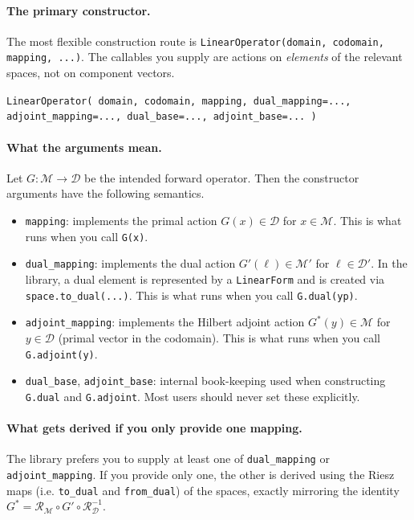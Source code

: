 \documentclass[11pt,twoside,openright]{book}
\theoremstyle{plain}
\theoremstyle{definition}
\theoremstyle{remark}
\newcommand{\modelspace}{\mathcal{M}}
\newcommand{\dataspace}{\mathcal{D}}
\newcommand{\Riesz}{\mathcal{R}}
\begin{document}
\paragraph{The primary constructor.}
The most flexible construction route is
\texttt{LinearOperator(domain, codomain, mapping, ...)}.
The callables you supply are actions on \emph{elements} of the relevant spaces,
not on component vectors.

\begin{codebox}
\texttt{LinearOperator(\
  domain, codomain, mapping,\
  dual\_mapping=..., adjoint\_mapping=...,\
  dual\_base=..., adjoint\_base=...\
)}
\end{codebox}

\paragraph{What the arguments mean.}
Let $G: \modelspace \to \dataspace$ be the intended forward operator.
Then the constructor arguments have the following semantics.
\begin{itemize}
  \item \texttt{mapping}: implements the primal action $G(x)\in\dataspace$ for
    $x\in\modelspace$. This is what runs when you call \texttt{G(x)}.
  \item \texttt{dual\_mapping}: implements the dual action
    $G'(\ell)\in\modelspace'$ for $\ell\in\dataspace'$. In the library, a dual
    element is represented by a \texttt{LinearForm} and is created via
    \texttt{space.to\_dual(...)}. This is what runs when you call
    \texttt{G.dual(yp)}.
  \item \texttt{adjoint\_mapping}: implements the Hilbert adjoint action
    $G^*(y)\in\modelspace$ for $y\in\dataspace$ (primal vector in the codomain).
    This is what runs when you call \texttt{G.adjoint(y)}.
  \item \texttt{dual\_base}, \texttt{adjoint\_base}: internal book-keeping used
    when constructing \texttt{G.dual} and \texttt{G.adjoint}. Most users should
    never set these explicitly.
\end{itemize}

\paragraph{What gets derived if you only provide one mapping.}
The library prefers you to supply at least one of \texttt{dual\_mapping} or
\texttt{adjoint\_mapping}. If you provide only one, the other is derived using
the Riesz maps (i.e. \texttt{to\_dual} and \texttt{from\_dual}) of the spaces,
exactly mirroring the identity
\(G^* = \Riesz_{\modelspace} \circ G' \circ \Riesz_{\dataspace}^{-1}\).
\end{document}
